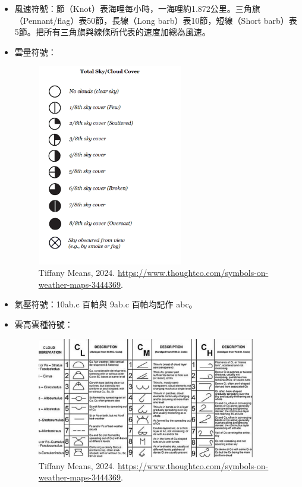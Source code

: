 \documentclass[a4paper,12pt]{report}
\begin{document}
\begin{itemize}
\begin{itemize}
\item 風速符號：節（Knot）表海哩每小時，一海哩約1.872公里。三角旗（Pennant/flag）表50節，長線（Long barb）表10節，短線（Short barb）表5節。把所有三角旗與線條所代表的速度加總為風速。
\item 雲量符號：
\bct\begin{figure}[H]\ctr\includegraphics[width=0.6\textwidth]{sky.png}\caption{Tiffany Means, 2024. \href{https://www.thoughtco.com/symbols-on-weather-maps-3444369}{https://www.thoughtco.com/symbols-on-weather-maps-3444369}.}\end{figure}\FB\ect
\item 氣壓符號：10ab.c 百帕與 9ab.c 百帕均記作 abc。
\item 雲高雲種符號：
\bct\begin{figure}[H]\ctr\includegraphics[width=0.9\textwidth]{cloud.jpg}\caption{Tiffany Means, 2024. \href{https://www.thoughtco.com/symbols-on-weather-maps-3444369}{https://www.thoughtco.com/symbols-on-weather-maps-3444369}.}\end{figure}\FB\ect

\end{itemize}
\end{itemize}
\end{document}
